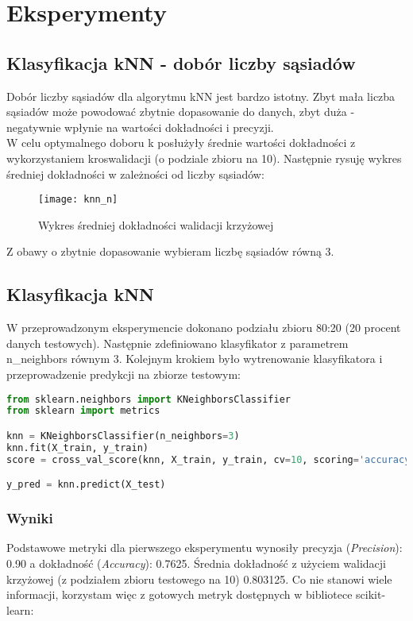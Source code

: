 \section{Eksperymenty}
\subsection{Klasyfikacja kNN - dobór liczby sąsiadów}
Dobór liczby sąsiadów dla algorytmu kNN jest bardzo istotny. Zbyt mała liczba sąsiadów może powodować zbytnie dopasowanie do danych, zbyt duża - negatywnie wpłynie na wartości dokładności i precyzji.\\

W celu optymalnego doboru k posłużyły średnie wartości dokładności z wykorzystaniem kroswalidacji (o podziale zbioru na 10). Następnie rysuję wykres średniej dokładności w zależności od liczby sąsiadów:

\begin{figure}[H]
    \centering
    \texttt{[image: knn\_n]}
    \caption{Wykres średniej dokładności walidacji krzyżowej}
    \label{fig:knn_n}
\end{figure}

Z obawy o zbytnie dopasowanie wybieram liczbę sąsiadów równą 3.

\subsection{Klasyfikacja kNN }
W przeprowadzonym eksperymencie dokonano podziału zbioru 80:20 (20 procent danych testowych). Następnie zdefiniowano klasyfikator z parametrem n\_neighbors równym 3. Kolejnym krokiem było wytrenowanie klasyfikatora i przeprowadzenie predykcji na zbiorze testowym:\\

\begin{lstlisting}[language=Python, caption=Definicja i użycie kNN]
from sklearn.neighbors import KNeighborsClassifier
from sklearn import metrics

knn = KNeighborsClassifier(n_neighbors=3)
knn.fit(X_train, y_train)
score = cross_val_score(knn, X_train, y_train, cv=10, scoring='accuracy')

y_pred = knn.predict(X_test)
\end{lstlisting}

\subsubsection{Wyniki}
Podstawowe metryki dla pierwszego eksperymentu wynosiły precyzja (\textit{Precision}): 0.90 a dokładność (\textit{Accuracy}): 0.7625. Średnia dokładność z użyciem walidacji krzyżowej (z podziałem zbioru testowego na 10) 0.803125. Co nie stanowi wiele informacji, korzystam więc z gotowych metryk dostępnych w bibliotece scikit-learn:\\

